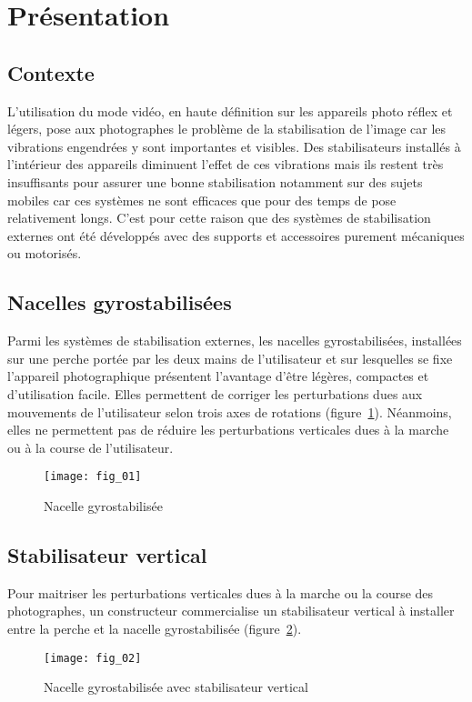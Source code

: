 \section{Présentation}
\subsection{Contexte}
L'utilisation du mode vidéo, en haute définition sur les appareils photo réflex et légers, pose aux photographes le problème de la stabilisation de l'image car les vibrations engendrées y sont importantes et visibles. Des stabilisateurs installés à l'intérieur des appareils diminuent l'effet de ces vibrations mais ils restent très insuffisants pour assurer une bonne stabilisation notamment sur des sujets mobiles car ces systèmes ne sont efficaces que pour des temps de pose relativement longs. C'est pour cette raison que des systèmes de stabilisation externes ont été développés avec des supports et accessoires purement mécaniques ou motorisés.

\subsection{Nacelles gyrostabilisées}
Parmi les systèmes de stabilisation externes, les nacelles gyrostabilisées, installées sur une perche portée par les deux mains de l'utilisateur et sur lesquelles se fixe l'appareil photographique présentent l'avantage d'être légères, compactes et d'utilisation facile. Elles permettent de corriger les perturbations dues aux mouvements de l'utilisateur selon trois axes de rotations (figure~\ref{fig:01}). Néanmoins, elles ne permettent pas de réduire les perturbations verticales dues à la marche ou à la course de l'utilisateur.

\begin{figure}[H]
\centering
\texttt{[image: fig\_01]}
\caption{\label{fig:01} Nacelle gyrostabilisée}
\end{figure}


\subsection{Stabilisateur vertical}
Pour maitriser les perturbations verticales dues à la marche ou la course des photographes, un constructeur commercialise un stabilisateur vertical à installer entre la perche et la nacelle gyrostabilisée (figure~\ref{fig:02}).

\begin{figure}[H]
\centering
\texttt{[image: fig\_02]}
\caption{\label{fig:02} Nacelle gyrostabilisée avec stabilisateur vertical}
\end{figure}


